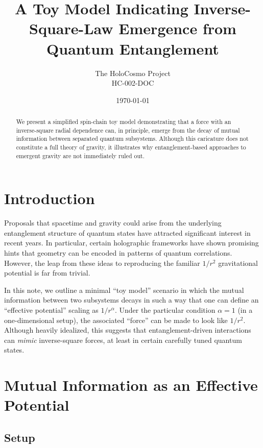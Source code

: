 \documentclass[12pt]{article}
\begin{document}
\title{A Toy Model Indicating Inverse-Square-Law Emergence from Quantum Entanglement}
\author{The HoloCosmo Project\\HC-002-DOC}
\date{\today}
\maketitle

\begin{abstract}
We present a simplified spin-chain toy model demonstrating that 
a force with an inverse-square radial dependence can, in principle, 
emerge from the decay of mutual information between separated quantum 
subsystems. Although this caricature does not constitute a full theory 
of gravity, it illustrates why entanglement-based approaches to 
emergent gravity are not immediately ruled out. 
\end{abstract}

\section{Introduction}

Proposals that spacetime and gravity could arise from the underlying 
entanglement structure of quantum states have attracted significant 
interest in recent years. In particular, certain holographic frameworks 
have shown promising hints that geometry can be encoded in patterns of 
quantum correlations. However, the leap from these ideas to reproducing 
the familiar $1/r^2$ gravitational potential is far from trivial.

In this note, we outline a minimal “toy model” scenario in which the 
mutual information between two subsystems decays in such a way that 
one can define an ``effective potential'' scaling as $1/r^\alpha$. 
Under the particular condition $\alpha = 1$ (in a one-dimensional 
setup), the associated ``force'' can be made to look like $1/r^2$. 
Although heavily idealized, this suggests that entanglement-driven 
interactions can \emph{mimic} inverse-square forces, at least in 
certain carefully tuned quantum states.

\section{Mutual Information as an Effective Potential}

\subsection{Setup}
\end{document}
